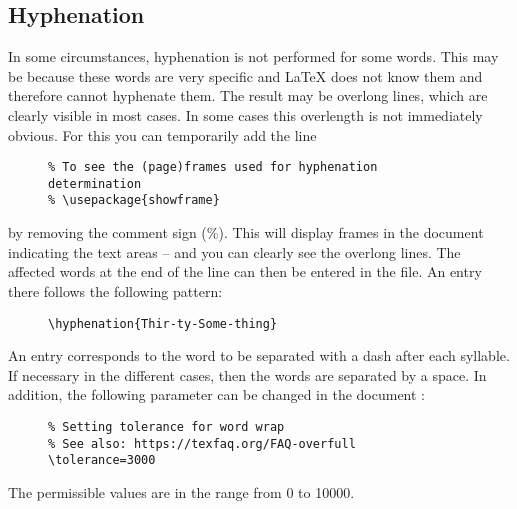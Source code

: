 \subsection{Hyphenation}

In some circumstances, hyphenation is not performed for some words. This may
be because these words are very specific and \LaTeX{} does not know them and
therefore cannot hyphenate them. The result may be overlong lines, which are
clearly visible in most cases. In some cases this overlength is not
immediately obvious. For this you can temporarily add the line

\begin{figure}[H]
    \small
    \centering
    \begin{BVerbatim}
    \end{BVerbatim}
\end{figure}

by removing the comment sign (\%). This will display frames in the document
indicating the text areas -- and you can clearly see the overlong lines. The
affected words at the end of the line can then be entered in the
 file. An entry there follows the
following pattern:

\begin{figure}[H]
    \small
    \centering
    \begin{BVerbatim}
\hyphenation{Thir-ty-Some-thing}
    \end{BVerbatim}
\end{figure}

An entry corresponds to the word to be separated with a dash after each
syllable. If necessary in the different cases, then the words are separated
by a space. In addition, the following parameter can be changed in the document
:

\begin{figure}[H]
    \small
    \centering
    \begin{BVerbatim}
\tolerance=3000
    \end{BVerbatim}
\end{figure}

The permissible values are in the range from 0 to 10000.

